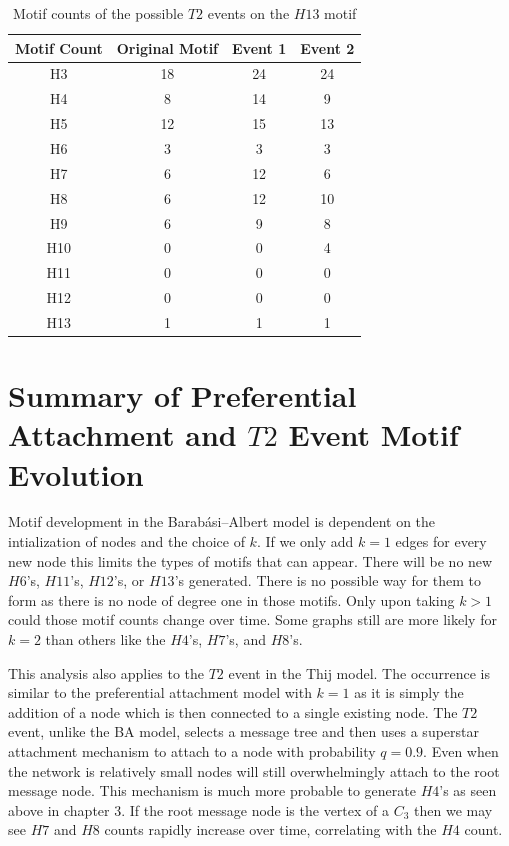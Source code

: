 \begin{table}
    \centering
    \begin{tabular}{||c c c c||} 
    \hline
    Motif Count & Original Motif & Event 1 & Event 2 \\ [0.5ex] 
    \hline\hline
    H3 & 18 & 24 & 24\\ 
    \hline
    H4 & 8 & 14 & 9  \\
    \hline
    H5 & 12 & 15 & 13  \\
    \hline
    H6 & 3 & 3 &3  \\
    \hline
    H7 & 6 & 12 & 6 \\
    \hline
    H8 & 6 & 12 & 10\\
    \hline
    H9 & 6 & 9 & 8 \\
    \hline
    H10 & 0 & 0 & 4  \\
    \hline
    H11 & 0 & 0 & 0  \\
    \hline
    H12 & 0 & 0 & 0 \\
    \hline
    H13 & 1 & 1 & 1 \\
    \hline
   \end{tabular}
   \caption{Motif counts of the possible $T2$ events on the $H13$ motif}
   \label{table:11}
\end{table}

\section{Summary of Preferential Attachment and $T2$ Event Motif Evolution}


Motif development in the Barabási–Albert model is dependent on the intialization of nodes and 
the choice of $k$. If we only add $k=1$ edges for every new node
this limits the types of motifs that can appear. There will be no new $H6$'s, $H11$'s,
$H12$'s, or $H13$'s generated. There is no possible way for them to form as there is no
node of degree one in those motifs. Only upon taking $k>1$ could those motif counts change over
 time. Some graphs still are more likely for $k=2$ than others like the $H4$'s, $H7$'s, and $H8$'s.

This analysis also applies to the $T2$ event in the Thij model. The occurrence is similar to
the preferential attachment model with $k=1$ as it is simply the addition of a node which is then
connected to a single existing node. The $T2$ event, unlike the BA model, selects a message tree 
and then uses a superstar attachment mechanism to attach to a node with probability $q=0.9$. Even when the network is relatively
small nodes will still overwhelmingly attach to the root message node. This mechanism is
much more probable to generate $H4$'s as seen above in chapter 3. If the root
message node is the vertex of a $C_3$ then we may see $H7$ and $H8$ counts
rapidly increase over time, correlating with the $H4$ count. 

